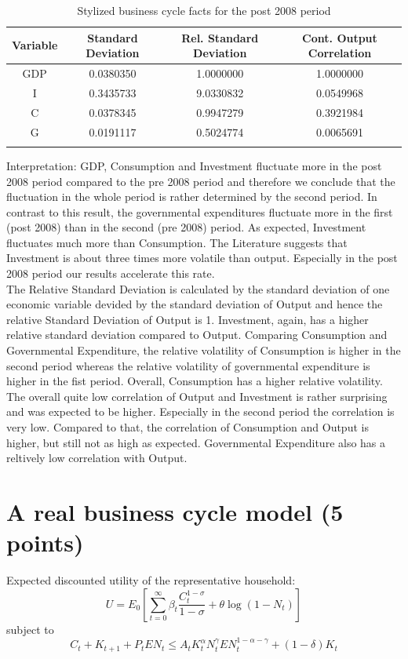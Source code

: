 \documentclass[a4paper,11pt]{article}
\begin{document}
\begin{longtable}[c]{cccc}
\toprule
Variable & Standard Deviation & Rel. Standard Deviation & Cont. Output Correlation\\* \midrule
\endfirsthead
\endhead
\bottomrule
\endfoot
\endlastfoot
GDP & 0.0380350 & 1.0000000 & 1.0000000\\
I & 0.3435733 & 9.0330832 & 0.0549968\\
C & 0.0378345 & 0.9947279 & 0.3921984\\
G & 0.0191117 & 0.5024774 & 0.0065691\\* \bottomrule
\caption{Stylized business cycle facts for the post 2008 period}
\end{longtable}
Interpretation: 
GDP, Consumption and Investment fluctuate more in the post 2008 period compared to the pre 2008 period and therefore we conclude that the fluctuation in the whole period is rather determined by the second period. In contrast to this result, the governmental expenditures fluctuate more in the first (post 2008) than in the second (pre 2008) period. As expected, Investment fluctuates much more than Consumption. The Literature suggests that Investment is about three times more volatile than output. Especially in the post 2008 period our results accelerate this rate.\\
The Relative Standard Deviation is calculated by the standard deviation of one economic variable devided by the standard deviation of Output and hence the relative Standard Deviation of Output is 1. Investment, again, has a higher relative standard deviation compared to Output. Comparing Consumption and Governmental Expenditure, the relative volatility of Consumption is higher in the second period whereas the relative volatility of governmental expenditure is higher in the fist period. Overall, Consumption has a higher relative volatility.\\
The overall quite low correlation of Output and Investment is rather surprising and was expected to be higher. Especially in the second period the correlation is very low. Compared to that, the correlation of Consumption and Output is higher, but still not as high as expected. Governmental Expenditure also has a reltively low correlation with Output. 


\pagebreak
\section{A real business cycle model (5 points)}
Expected discounted utility of the representative household:
\begin{equation*}
  U = E_0\left[\sum_{t=0}^\infty\beta_t\frac{C_t^{1-\sigma}}{1-\sigma}+\theta \log(1-N_t)\right] \label{eq:Utility}
\end{equation*}
subject to
\begin{equation*}
  C_t + K_{t+1}+P_tEN_t \leq A_tK_t^\alpha N_t^\gamma EN_t^{1-\alpha-\gamma}+(1-\delta)K_t \label{eq:Constraint}
\end{equation*}
\end{document}
